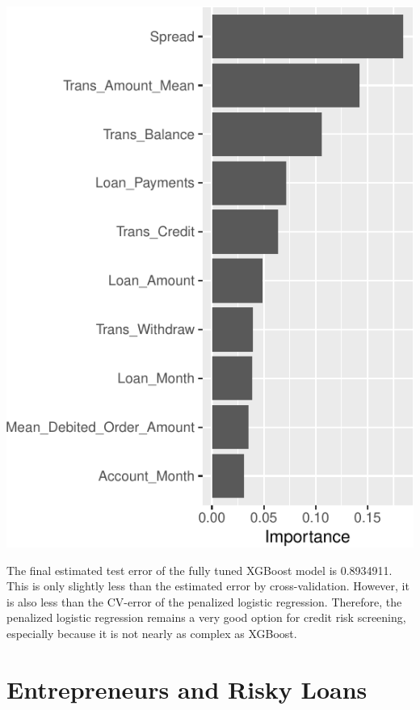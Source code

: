 \documentclass[11pt,preprint, authoryear]{elsarticle}
\let\origfigure\figure
\let\endorigfigure\endfigure
\renewenvironment{figure}[1][2] {
    \expandafter\origfigure\expandafter[H]
} {
    \endorigfigure
}
\numberwithin{equation}{section}
\numberwithin{figure}{section}
\numberwithin{table}{section}
\begin{document}
\begin{figure}[H]

{\centering \includegraphics{DS-Report-20065124_files/figure-latex/unnamed-chunk-35-1} 

}

\caption{Variable Importance \label{FigureVIP}}\label{fig:unnamed-chunk-35}
\end{figure}

The final estimated test error of the fully tuned XGBoost model is
0.8934911. This is only slightly less than the estimated error by
cross-validation. However, it is also less than the CV-error of the
penalized logistic regression. Therefore, the penalized logistic
regression remains a very good option for credit risk screening,
especially because it is not nearly as complex as XGBoost.

\hypertarget{entrepreneurs-and-risky-loans}{%
\section{Entrepreneurs and Risky
Loans}\label{entrepreneurs-and-risky-loans}}
\end{document}
